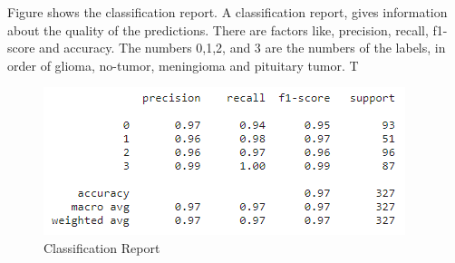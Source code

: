 Figure shows the classification report. A classification report, gives information about the quality of the predictions. There are factors like, precision, recall, f1-score and accuracy. The numbers 0,1,2, and 3 are the numbers of the labels, in order of glioma, no-tumor, meningioma and pituitary tumor. T
\begin{figure}[H]
\includegraphics[scale=1.3]{Photos/class_report.PNG}
\caption{Classification Report} \label{fig:class_report}
\end{figure}

